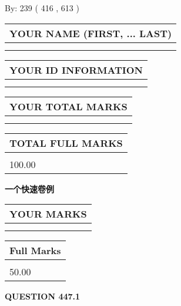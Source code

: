 \documentclass{ctexart}
\begin{document}
   
\hspace{1.0in} By: 
 239 ( 416 ,  613 )
   
   
   
   
\newpage 
\setcounter{page}{ 
   447001 } 
   
   
   
   
\noindent\begin{tabular}{|l|}
\hline
YOUR NAME (FIRST, ... LAST)  \\
\hline
 \\ 
 \\ 
\hline
\end{tabular}
\hspace{0.05in} \begin{tabular}{|l|}
\hline
 YOUR   ID   INFORMATION  \\
\hline
 \\ 
 \\ 
\hline
\end{tabular}
   
   
\vspace{0.2in}\noindent\begin{tabular}{|l|}
\hline
YOUR TOTAL MARKS  \\
\hline
 \\ 
 \\ 
\hline
\end{tabular}
\hspace{0.05in} \begin{tabular}{|l|}
\hline
TOTAL FULL MARKS  \\
\hline
 \\ 
100.00 \\
\hline
\end{tabular}
   
   
 \vspace{0.2in}
{\LARGE {\textbf{ 一个快速卷例}}}
   
   
  
\vspace{0.2in}
  
\noindent\begin{tabular}{|l|}
\hline
 YOUR MARKS  \\
\hline
 \\ 
 \\ 
\hline
\end{tabular}
\hspace{0.05in} \begin{tabular}{|l|}
\hline
 Full Marks  \\
\hline
 \\ 
50.00 \\
\hline
\end{tabular}
{\textbf{\Large{QUESTION
447.1 
}}}
  
\end{document}
